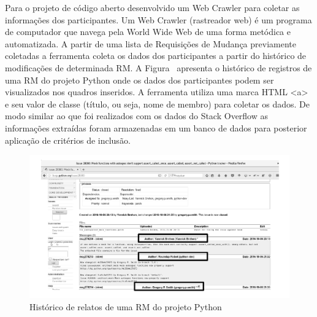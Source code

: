 Para o projeto de código aberto desenvolvido um Web Crawler para coletar as
informações dos participantes. Um Web Crawler (rastreador web) é um programa de
computador que navega pela World Wide Web de uma forma metódica e automatizada.
A partir de uma lista de Requisições de Mudança previamente coletadas a
ferramenta coleta os dados dos participantes a partir do histórico de
modificações de determinada RM\@. A Figura~\cite{fig:historico-rm-python}
apresenta o histórico de registros de uma RM do projeto Python onde os dados dos
participantes podem ser visualizados nos quadros inseridos. A ferramenta utiliza
uma marca HTML <a> e seu valor de classe (título, ou seja, nome de membro) para
coletar os dados. De modo similar ao que foi realizados com os dados do Stack
Overflow as informações extraídas foram armazenadas em um banco de dados para
posterior aplicação de critérios de inclusão.

\begin{figure}[htpb]
	\centering
	\includegraphics[width=0.8\linewidth]{./chapter-pesquisa-com-profissionais/img/historico-rm-python.pdf}
	\caption{Histórico de relatos de uma RM do projeto Python}
\label{fig:historico-rm-python}
\end{figure}



